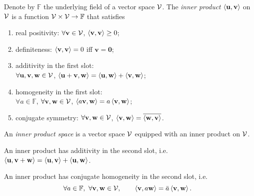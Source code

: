 \begin{defn}
  \label{def:innerProduct}
  Denote by $\mathbb{F}$ the underlying field of
  a vector space ${\cal V}$.
  The \emph{inner product} $\left\langle \mathbf{u},\mathbf{v} \right\rangle$ on ${\cal V}$
  is a function ${\cal V}\times{\cal V}\rightarrow \mathbb{F}$
  that satisfies
  \begin{enumerate}[({IP}-1)]
    \itemsep0em
  \item real positivity: 
    $\forall \mathbf{v}\in{\cal V}$,
    $\left\langle \mathbf{v},\mathbf{v} \right\rangle\ge 0$;
  \item definiteness:
    $\left\langle \mathbf{v},\mathbf{v} \right\rangle= 0$
    iff $\mathbf{v}=\mathbf{0}$;
  \item additivity in the first slot:\\
    $\forall \mathbf{u},\mathbf{v},\mathbf{w}\in{\cal V}$,
    $\left\langle \mathbf{u}+\mathbf{v},\mathbf{w} \right\rangle
    = \left\langle \mathbf{u},\mathbf{w} \right\rangle
    + \left\langle \mathbf{v},\mathbf{w} \right\rangle$;
  \item homogeneity in the first slot:\\
    $\forall a\in \mathbb{F}$,
    $\forall \mathbf{v},\mathbf{w}\in{\cal V}$,
    $\left\langle a\mathbf{v},\mathbf{w} \right\rangle
    = a\left\langle \mathbf{v},\mathbf{w} \right\rangle$;
  \item conjugate symmetry:
    $\forall \mathbf{v},\mathbf{w}\in{\cal V}$,
    $\left\langle \mathbf{v},\mathbf{w} \right\rangle
    = \overline{\left\langle \mathbf{w},\mathbf{v} \right\rangle}$.
  \end{enumerate}
  An \emph{inner product space} is a vector space ${\cal V}$
  equipped with an inner product on ${\cal V}$.
\end{defn}

\begin{coro}
  \label{coro:additivity2ndSlot}
  An inner product has additivity
  in the second slot, i.e.
  $\left\langle \mathbf{u}, \mathbf{v}+\mathbf{w} \right\rangle
  = \left\langle \mathbf{u}, \mathbf{v} \right\rangle
  + \left\langle \mathbf{u}, \mathbf{w} \right\rangle$.
\end{coro}

\begin{coro}
  \label{coro:conjugatehomogeneity}
  An inner product has conjugate homogeneity
  in the second slot,
  i.e.
  \begin{equation}
    \label{eq:conjugatehomogeneity}
    \forall a\in \mathbb{F},\ 
    \forall \mathbf{v},\mathbf{w}\in{\cal V},\qquad 
    \innerProd{\mathbf{v},a\mathbf{w}}
    = \bar{a}\innerProd{\mathbf{v},\mathbf{w}}.
  \end{equation}
\end{coro}

